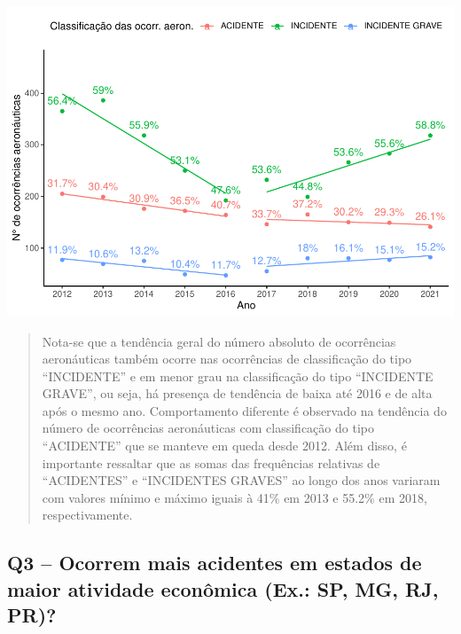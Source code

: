 \documentclass[
]{article}
\begin{document}
\begin{center}\includegraphics[width=1\linewidth]{../4.Relatorio/pdf/index_files/figure-latex/unnamed-chunk-26-1} \end{center}

\begin{quote}
Nota-se que a tendência geral do número absoluto de ocorrências
aeronáuticas também ocorre nas ocorrências de classificação do tipo
``INCIDENTE'' e em menor grau na classificação do tipo ``INCIDENTE
GRAVE'', ou seja, há presença de tendência de baixa até 2016 e de alta
após o mesmo ano. Comportamento diferente é observado na tendência do
número de ocorrências aeronáuticas com classificação do tipo
``ACIDENTE'' que se manteve em queda desde 2012. Além disso, é
importante ressaltar que as somas das frequências relativas de
``ACIDENTES'' e ``INCIDENTES GRAVES'' ao longo dos anos variaram com
valores mínimo e máximo iguais à 41\% em 2013 e 55.2\% em 2018,
respectivamente.
\end{quote}

\hypertarget{q3-ocorrem-mais-acidentes-em-estados-de-maior-atividade-econuxf4mica-ex.-sp-mg-rj-pr}{%
\subsection{Q3 -- Ocorrem mais acidentes em estados de maior atividade
econômica (Ex.: SP, MG, RJ,
PR)?}\label{q3-ocorrem-mais-acidentes-em-estados-de-maior-atividade-econuxf4mica-ex.-sp-mg-rj-pr}}
\end{document}
